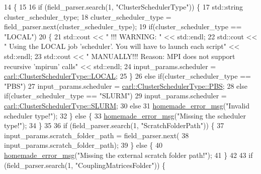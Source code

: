 \begin{DoxyCode}
14                                                 \{
15 
16     \textcolor{keywordflow}{if} (field\_parser.search(1, \textcolor{stringliteral}{"ClusterSchedulerType"})) \{
17         std::string cluster\_scheduler\_type;
18         cluster\_scheduler\_type = field\_parser.next(cluster\_scheduler\_type);
19         \textcolor{keywordflow}{if}(cluster\_scheduler\_type == \textcolor{stringliteral}{"LOCAL"})
20         \{
21             std::cout << \textcolor{stringliteral}{" !!! WARNING: "} << std::endl;
22             std::cout << \textcolor{stringliteral}{"        Using the LOCAL job 'scheduler'. You will have to launch each script"} << 
      std::endl;
23             std::cout << \textcolor{stringliteral}{"     MANUALLY!!! Reason: MPI does not support recursive 'mpirun' calls"} << 
      std::endl;
24             input\_params.scheduler = \hyperlink{namespacecarl_a67066fdf35a0c326f5147098c0cf45d1a2bec097bc495ac4aacc355d3283f4b93}{carl::ClusterSchedulerType::LOCAL};
25         \}
26         \textcolor{keywordflow}{else} \textcolor{keywordflow}{if}(cluster\_scheduler\_type == \textcolor{stringliteral}{"PBS"})
27             input\_params.scheduler = \hyperlink{namespacecarl_a67066fdf35a0c326f5147098c0cf45d1adc92b93f87f72ed91ac097d8c15da06e}{carl::ClusterSchedulerType::PBS};
28         \textcolor{keywordflow}{else} \textcolor{keywordflow}{if}(cluster\_scheduler\_type == \textcolor{stringliteral}{"SLURM"})
29             input\_params.scheduler = \hyperlink{namespacecarl_a67066fdf35a0c326f5147098c0cf45d1a07a7582870a2087891d8eeaddf964ba0}{carl::ClusterSchedulerType::SLURM};
30         \textcolor{keywordflow}{else}
31             \hyperlink{common__header_8h_a05d65d26b911668ac90085745dca71f6}{homemade\_error\_msg}(\textcolor{stringliteral}{"Invalid scheduler type!"});
32     \} \textcolor{keywordflow}{else} \{
33         \hyperlink{common__header_8h_a05d65d26b911668ac90085745dca71f6}{homemade\_error\_msg}(\textcolor{stringliteral}{"Missing the scheduler type!"});
34     \}
35 
36     \textcolor{keywordflow}{if} (field\_parser.search(1, \textcolor{stringliteral}{"ScratchFolderPath"})) \{
37         input\_params.scratch\_folder\_path = field\_parser.next(
38                 input\_params.scratch\_folder\_path);
39     \} \textcolor{keywordflow}{else} \{
40         \hyperlink{common__header_8h_a05d65d26b911668ac90085745dca71f6}{homemade\_error\_msg}(\textcolor{stringliteral}{"Missing the external scratch folder path!"});
41     \}
42 
43     \textcolor{keywordflow}{if} (field\_parser.search(1, \textcolor{stringliteral}{"CouplingMatricesFolder"})) \{

\end{DoxyCode}

